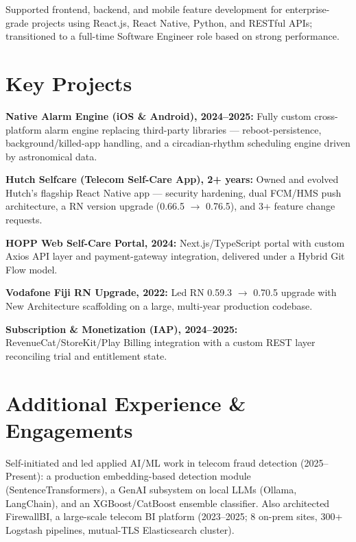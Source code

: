 \documentclass[10.5pt]{article}
\begin{document}
\begin{cvitems}
  \item Supported frontend, backend, and mobile feature development for enterprise-grade projects using React.js, React Native, Python, and RESTful APIs; transitioned to a full-time Software Engineer role based on strong performance.
\end{cvitems}

\section*{Key Projects}
\begin{cvitems}
  \item \textbf{Native Alarm Engine (iOS \& Android), 2024--2025:} Fully custom cross-platform alarm engine replacing third-party libraries --- reboot-persistence, background/killed-app handling, and a circadian-rhythm scheduling engine driven by astronomical data.
  \item \textbf{Hutch Selfcare (Telecom Self-Care App), 2+ years:} Owned and evolved Hutch's flagship React Native app --- security hardening, dual FCM/HMS push architecture, a RN version upgrade (0.66.5 $\rightarrow$ 0.76.5), and 3+ feature change requests.
  \item \textbf{HOPP Web Self-Care Portal, 2024:} Next.js/TypeScript portal with custom Axios API layer and payment-gateway integration, delivered under a Hybrid Git Flow model.
  \item \textbf{Vodafone Fiji RN Upgrade, 2022:} Led RN 0.59.3 $\rightarrow$ 0.70.5 upgrade with New Architecture scaffolding on a large, multi-year production codebase.
  \item \textbf{Subscription \& Monetization (IAP), 2024--2025:} RevenueCat/StoreKit/Play Billing integration with a custom REST layer reconciling trial and entitlement state.
\end{cvitems}

\section*{Additional Experience \& Engagements}
Self-initiated and led applied AI/ML work in telecom fraud detection (2025--Present): a production embedding-based detection module (SentenceTransformers), a GenAI subsystem on local LLMs (Ollama, LangChain), and an XGBoost/CatBoost ensemble classifier. Also architected FirewallBI, a large-scale telecom BI platform (2023--2025; 8 on-prem sites, 300+ Logstash pipelines, mutual-TLS Elasticsearch cluster).
\end{document}
